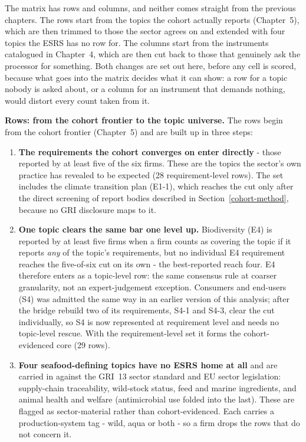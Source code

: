 The matrix has rows and columns, and neither comes straight from the previous
chapters. The rows start from the topics the cohort actually reports
(Chapter~5), which are then trimmed to those the sector agrees on and extended
with four topics the ESRS has no row for. The columns start from the instruments
catalogued in Chapter~4, which are then cut back to those that genuinely ask the
processor for something. Both changes are set out here, before any cell is
scored, because what goes into the matrix decides what it can show: a row for a
topic nobody is asked about, or a column for an instrument that demands nothing,
would distort every count taken from it.

\textbf{Rows: from the cohort frontier to the topic universe.} The rows begin from
the cohort frontier (Chapter~5) and are built up in three steps:

\begin{enumerate}
\item \textbf{The requirements the cohort converges on enter directly} - those
reported by at least five of the six firms. These are the topics the sector's own
practice has revealed to be expected (28 requirement-level rows). The set includes
the climate transition plan (E1-1), which reaches the cut only after the direct
screening of report bodies described in Section~\ref{cohort-method}, because no
GRI disclosure maps to it.

\item \textbf{One topic clears the same bar one level up.} Biodiversity (E4) is
reported by at least five firms when a firm counts as covering the topic if it
reports \emph{any} of the topic's requirements, but no individual E4 requirement
reaches the five-of-six cut on its own - the best-reported reach four. E4
therefore enters as a topic-level row: the same consensus rule at coarser
granularity, not an expert-judgement exception. Consumers and end-users (S4) was
admitted the same way in an earlier version of this analysis; after the bridge
rebuild two of its requirements, S4-1 and S4-3, clear the cut individually, so S4
is now represented at requirement level and needs no topic-level rescue. With the
requirement-level set it forms the cohort-evidenced core (29 rows).

\item \textbf{Four seafood-defining topics have no ESRS home at all} and are
carried in against the GRI~13 sector standard and EU sector legislation:
supply-chain traceability, wild-stock status, feed and marine ingredients, and
animal health and welfare (antimicrobial use folded into the last). These are
flagged as sector-material rather than cohort-evidenced. Each carries a
production-system tag - wild, aqua or both - so a firm drops the rows that do not
concern it.
\end{enumerate}

